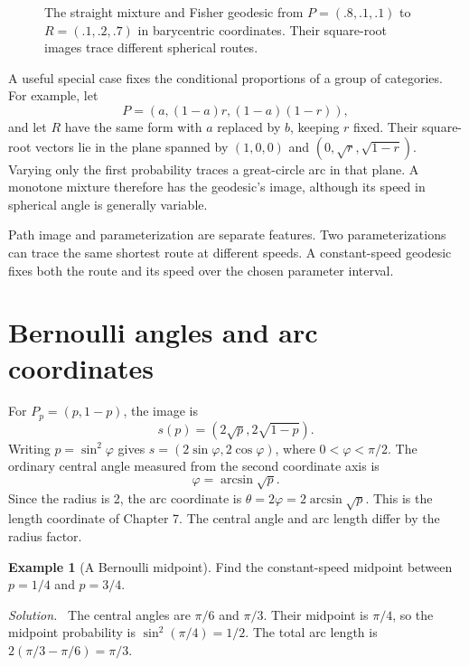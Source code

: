 \documentclass[11pt,oneside,openany]{book}
\theoremstyle{definition}
\newtheorem{example}{Example}[chapter]
\theoremstyle{remark}
\newenvironment{solution}{\par\smallskip\noindent\textit{Solution.}\ }{\par\smallskip}
\numberwithin{equation}{chapter}
\begin{document}
\begin{figure}[htbp]
\caption{The straight mixture and Fisher geodesic from $P=(.8,.1,.1)$ to $R=(.1,.2,.7)$ in barycentric coordinates. Their square-root images trace different spherical routes.}\end{figure}

A useful special case fixes the conditional proportions of a group of categories. For example, let
\[
P=(a,(1-a)r,(1-a)(1-r)),
\]
and let $R$ have the same form with $a$ replaced by $b$, keeping $r$ fixed. Their square-root vectors lie in the plane spanned by $(1,0,0)$ and $(0,\sqrt r,\sqrt{1-r})$. Varying only the first probability traces a great-circle arc in that plane. A monotone mixture therefore has the geodesic's image, although its speed in spherical angle is generally variable.

Path image and parameterization are separate features. Two parameterizations can trace the same shortest route at different speeds. A constant-speed geodesic fixes both the route and its speed over the chosen parameter interval.

\section{Bernoulli angles and arc coordinates}
For $P_p=(p,1-p)$, the image is
\[
s(p)=(2\sqrt p,2\sqrt{1-p}).
\]
Writing $p=\sin^2\varphi$ gives $s=(2\sin\varphi,2\cos\varphi)$, where $0<\varphi<\pi/2$. The ordinary central angle measured from the second coordinate axis is
\[
\varphi=\arcsin\sqrt p.
\]
Since the radius is 2, the arc coordinate is $\theta=2\varphi=2\arcsin\sqrt p$. This is the length coordinate of Chapter 7. The central angle and arc length differ by the radius factor.

\begin{example}[A Bernoulli midpoint]
Find the constant-speed midpoint between $p=1/4$ and $p=3/4$.
\begin{solution}
The central angles are $\pi/6$ and $\pi/3$. Their midpoint is $\pi/4$, so the midpoint probability is $\sin^2(\pi/4)=1/2$. The total arc length is $2(\pi/3-\pi/6)=\pi/3$.
\end{solution}
\end{example}
\end{document}

